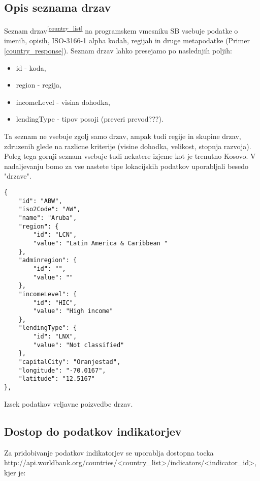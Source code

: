 \subsection{Opis seznama drzav}

Seznam drzav\textsuperscript{\ref{country_list}}  na programskem vmesniku SB 
vsebuje podatke o imenih, opisih, ISO-3166-1 alpha kodah, regijah in druge 
metapodatke (Primer \ref{country_response}). Seznam drzav lahko presejamo po
naslednjih poljih:
\begin{itemize}
\item id - koda,
\item region - regija,
\item incomeLevel - visina dohodka,
\item lendingType - tipov posoji (preveri prevod???).
\end{itemize}

Ta seznam ne vsebuje zgolj samo drzav, ampak tudi regije in skupine drzav, 
zdruzenih glede na razlicne kriterije (visine dohodka, velikost, stopnja
razvoja). Poleg tega gornji seznam vsebuje tudi nekatere izjeme kot je trenutno
Kosovo. V nadaljevanju bomo za vse nastete tipe lokacijskih podatkov
uporabljali besedo "drzave".

\begin{snippet}
\begin{center}
\begin{lstlisting}
{
    "id": "ABW",
    "iso2Code": "AW",
    "name": "Aruba",
    "region": {
        "id": "LCN",
        "value": "Latin America & Caribbean "
    },
    "adminregion": {
        "id": "",
        "value": ""
    },
    "incomeLevel": {
        "id": "HIC",
        "value": "High income"
    },
    "lendingType": {
        "id": "LNX",
        "value": "Not classified"
    },
    "capitalCity": "Oranjestad",
    "longitude": "-70.0167",
    "latitude": "12.5167"
},
\end{lstlisting}
\end{center}
\caption[some]{Izsek podatkov veljavne poizvedbe drzav.}
\label{country_response}
\end{snippet} 


\subsection{Dostop do podatkov indikatorjev}


Za pridobivanje podatkov indikatorjev se uporablja dostopna tocka
http://api.worldbank.org/countries/<country\_list>/indicators/<indicator\_id>,
kjer je:


